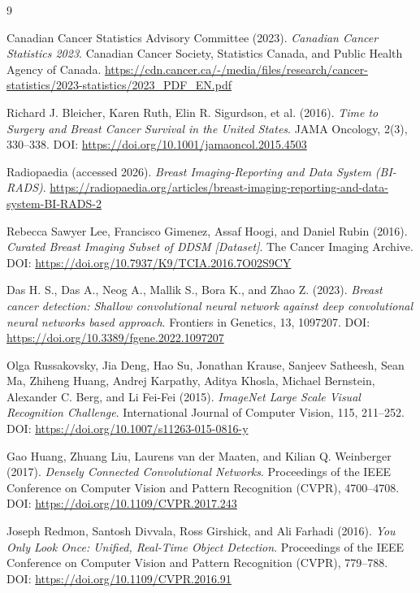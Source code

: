 \documentclass[12pt]{article}
\begin{document}
\clearpage
\begin{thebibliography}{9}

Canadian Cancer Statistics Advisory Committee (2023). \emph{Canadian Cancer Statistics 2023}. Canadian Cancer Society, Statistics Canada, and Public Health Agency of Canada. \url{https://cdn.cancer.ca/-/media/files/research/cancer-statistics/2023-statistics/2023_PDF_EN.pdf}

Richard J. Bleicher, Karen Ruth, Elin R. Sigurdson, et al. (2016). \emph{Time to Surgery and Breast Cancer Survival in the United States}. JAMA Oncology, 2(3), 330--338. DOI: \url{https://doi.org/10.1001/jamaoncol.2015.4503}

Radiopaedia (accessed 2026). \emph{Breast Imaging-Reporting and Data System (BI-RADS)}. \url{https://radiopaedia.org/articles/breast-imaging-reporting-and-data-system-BI-RADS-2}

Rebecca Sawyer Lee, Francisco Gimenez, Assaf Hoogi, and Daniel Rubin (2016). \emph{Curated Breast Imaging Subset of DDSM [Dataset]}. The Cancer Imaging Archive. DOI: \url{https://doi.org/10.7937/K9/TCIA.2016.7O02S9CY}

Das H. S., Das A., Neog A., Mallik S., Bora K., and Zhao Z. (2023). \emph{Breast cancer detection: Shallow convolutional neural network against deep convolutional neural networks based approach}. Frontiers in Genetics, 13, 1097207. DOI: \url{https://doi.org/10.3389/fgene.2022.1097207}

Olga Russakovsky, Jia Deng, Hao Su, Jonathan Krause, Sanjeev Satheesh, Sean Ma, Zhiheng Huang, Andrej Karpathy, Aditya Khosla, Michael Bernstein, Alexander C. Berg, and Li Fei-Fei (2015). \emph{ImageNet Large Scale Visual Recognition Challenge}. International Journal of Computer Vision, 115, 211--252. DOI: \url{https://doi.org/10.1007/s11263-015-0816-y}

Gao Huang, Zhuang Liu, Laurens van der Maaten, and Kilian Q. Weinberger (2017). \emph{Densely Connected Convolutional Networks}. Proceedings of the IEEE Conference on Computer Vision and Pattern Recognition (CVPR), 4700--4708. DOI: \url{https://doi.org/10.1109/CVPR.2017.243}

Joseph Redmon, Santosh Divvala, Ross Girshick, and Ali Farhadi (2016). \emph{You Only Look Once: Unified, Real-Time Object Detection}. Proceedings of the IEEE Conference on Computer Vision and Pattern Recognition (CVPR), 779--788. DOI: \url{https://doi.org/10.1109/CVPR.2016.91}

\end{thebibliography}
\end{document}
